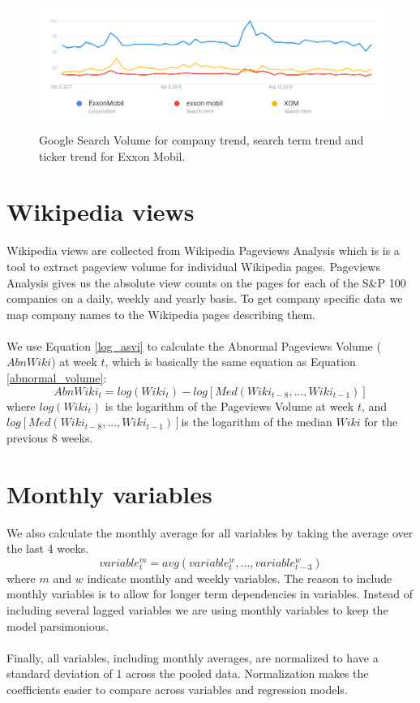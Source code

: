 \begin{figure}[h!]
  \centering
    \includegraphics[width=1\textwidth]{fig/xomStatisticsGoogleTrendsAddedExplanation.png}
 \caption{Google Search Volume for company trend, search term trend and ticker trend for Exxon Mobil.}
\label{fig:xomStatisticsGoogleTrends}
\end{figure}

\section{Wikipedia views}

Wikipedia views are collected from Wikipedia Pageviews Analysis which is is a tool to extract pageview volume for individual Wikipedia pages. Pageviews Analysis gives us the absolute view counts on the pages for each of the S\&P 100 companies on a daily, weekly and yearly basis. To get company specific data we map company names to the Wikipedia pages describing them.
\\\\
We use Equation \eqref{log_asvi} to calculate the Abnormal Pageviews Volume ($AbnWiki$) at week $t$, which is basically the same equation as Equation \eqref{abnormal_volume}:
\begin{equation}
   \label{abnormal_pageviews_volume} 
   AbnWiki_{t} = log(Wiki_{t}) - log[Med(Wiki_{t-8},...,Wiki_{t-1})] 
\end{equation}
   where $log(Wiki_{t})$ is the logarithm of the Pageviews Volume at week $t$, and $log[Med(Wiki_{t-8},...,Wiki_{t-1})]$is the logarithm of the median $Wiki$ for the previous 8 weeks.

\section{Monthly variables}
 We also calculate the monthly average for all variables by taking the average over the last 4 weeks. 
\begin{equation}
   \label{monthly_var} 
   variable^{m}_t = avg(variable^{w}_{t},...,variable^{w}_{t-3}) 
\end{equation}
where $m$ and $w$ indicate monthly and weekly variables. The reason to include monthly variables is to allow for longer term dependencies in variables. Instead of including several lagged variables we are using monthly variables to keep the model parsimonious.
\\\\
Finally, all variables, including monthly averages, are normalized to have a standard deviation of 1 across the pooled data. Normalization makes the coefficients easier to compare across variables and regression models.
